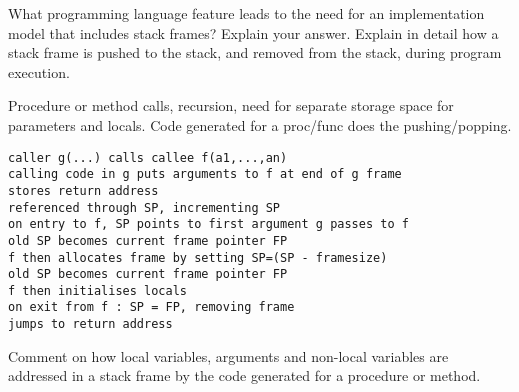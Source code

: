 \documentclass[11pt]{bareexam}
\begin{document}
\begin{questions}

\question

\setcounter{page}{2}

\begin{subquestions}

%


\subquestion
What programming language feature leads to the need for an
implementation model that includes stack frames? Explain your answer.
Explain in detail how a stack frame is pushed to the stack, and 
removed from the stack, during program execution. 

\begin{modelanswer}
Procedure or method calls, recursion, need for separate storage space for
parameters and locals.
Code generated for a proc/func does the pushing/popping.
\begin{verbatim}
caller g(...) calls callee f(a1,...,an)
calling code in g puts arguments to f at end of g frame
stores return address
referenced through SP, incrementing SP
on entry to f, SP points to first argument g passes to f
old SP becomes current frame pointer FP
f then allocates frame by setting SP=(SP - framesize)
old SP becomes current frame pointer FP
f then initialises locals
on exit from f : SP = FP, removing frame
jumps to return address
\end{verbatim}
\end{modelanswer}

\subquestion
Comment on how local variables, arguments and non-local variables
are addressed in a stack frame by 
the code generated for a procedure or method. 


\end{subquestions}
\end{questions}
\end{document}
